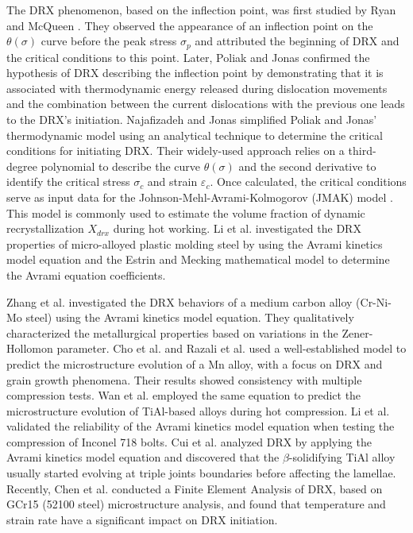 \documentclass[metals,article,submit,pdftex,moreauthors]{Definitions/mdpi}
\makeatletter
\DeclareRobustCommand{\eal}{et al.\@\xspace}
\makeatother
\begin{document}
The DRX phenomenon, based on the inflection point, was first studied by Ryan and McQueen \cite{Ryan-1989, Ryan-1990, Ryan-1990-2}.
They observed the appearance of an inflection point on the $\theta(\sigma)$ curve before the peak stress $\sigma_p$ and attributed the beginning of DRX and the critical conditions to this point.
Later, Poliak and Jonas \cite{Poliak-1996,Poliak-2003,Poliak-2003-2,Jonas-2003} confirmed the hypothesis of DRX describing the inflection point by demonstrating that it is associated with thermodynamic energy released during dislocation movements and the combination between the current dislocations with the previous one leads to the DRX's initiation.
Najafizadeh and Jonas \cite{Najafizadeh-2006} simplified Poliak and Jonas' thermodynamic model using an analytical technique to determine the critical conditions for initiating DRX.
Their widely-used approach relies on a third-degree polynomial to describe the curve $\theta(\sigma)$ and the second derivative to identify the critical stress $\sigma_c$ and strain $\varepsilon_c$.
Once calculated, the critical conditions serve as input data for the Johnson-Mehl-Avrami-Kolmogorov (JMAK) model \cite{Avrami-1939}.
This model is commonly used to estimate the volume fraction of dynamic recrystallization $X_{drx}$ during hot working.
Li \eal \cite{Li-2015} investigated the DRX properties of micro-alloyed plastic molding steel by using the Avrami kinetics model equation and the Estrin and Mecking mathematical model \cite{Estrin-1984,Mecking-1981} to determine the Avrami equation coefficients.

Zhang \eal \cite{Zhang-2016} investigated the DRX behaviors of a medium carbon alloy (Cr-Ni-Mo steel) using the Avrami kinetics model equation.
They qualitatively characterized the metallurgical properties based on variations in the Zener-Hollomon parameter.
Cho \eal \cite{Cho-2005} and Razali \eal \cite{Razali-2021} used a well-established model to predict the microstructure evolution of a Mn alloy, with a focus on DRX and grain growth phenomena.
Their results showed consistency with multiple compression tests.
Wan \eal \cite{Wan-2017} employed the same equation to predict the microstructure evolution of TiAl-based alloys during hot compression.
Li \eal \cite{Li-2018} validated the reliability of the Avrami kinetics model equation when testing the compression of Inconel 718 bolts.
Cui \eal \cite{Cui-2016} analyzed DRX by applying the Avrami kinetics model equation and discovered that the $\beta$-solidifying TiAl alloy usually started evolving at triple joints boundaries before affecting the lamellae.
Recently, Chen \eal \cite{Chen-2023} conducted a Finite Element Analysis of DRX, based on GCr15 (52100 steel) microstructure analysis, and found that temperature and strain rate have a significant impact on DRX initiation.
\end{document}

